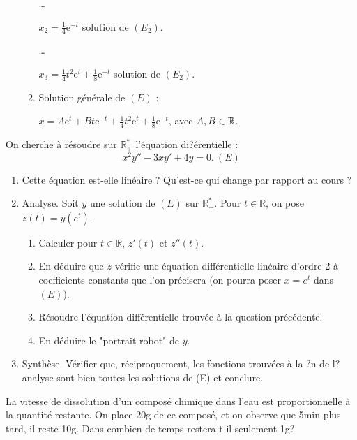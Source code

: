 \documentclass{book}
\begin{document}
\begin{Exercice}
\begin{Correction}
\begin{enumerate}
\begin{enumerate}
		\dots
		
		\hspace{0.7cm} $x_{2} = \tfrac{ 1 }{4}  \mathrm{e}^{ -t} $ solution de $( E_2 )$.		

		\dots
		
		\hspace{0.7cm} $x_{3} = \tfrac{ 1 }{4} t^2 \mathrm{e}^{ t}  + \tfrac{ 1 }{8}  \mathrm{e}^{ -t} $ solution de $( E_2 )$.	
		
		\item Solution générale de $(E)$ :
		
		\hspace{0.7cm} $x =   A  \mathrm{e}^{t} + B t  \mathrm{e}^{-t} +  \tfrac{ 1 }{4} t^2 \mathrm{e}^{ t}  + \tfrac{ 1 }{8}  \mathrm{e}^{ -t}$, avec $A,B \in \mathbb{R}$.	
	\end{enumerate}
\end{enumerate} 
\end{Correction}
\end{Exercice}
\begin{Exercice}
On cherche à résoudre sur $\mathbb R_+^*$ l'équation di?érentielle :
$$x^2y''-3xy'+4y = 0.\ (E)$$
\begin{enumerate}
\item Cette équation est-elle linéaire ? Qu'est-ce qui change par rapport au cours ?
\item Analyse. Soit $y$ une solution de $(E)$ sur $\mathbb R_+^*$. Pour $t\in\mathbb R$, on pose $z(t)=y(e^t)$.
\begin{enumerate}
\item Calculer pour $t\in\mathbb R$, $z'(t)$ et $z''(t)$.
\item En déduire que $z$ vérifie une équation différentielle linéaire d'ordre 2 à coefficients  constants que l'on précisera (on pourra poser $x = e^t$ dans $(E)$). 
\item Résoudre l'équation différentielle trouvée à la question précédente.
\item En déduire le "portrait robot" de $y$.
\end{enumerate}
\item Synthèse. Vérifier que, réciproquement, les fonctions trouvées à la ?n de l?analyse sont bien toutes les solutions de (E) et conclure.
\end{enumerate}
\end{Exercice}
\begin{Exercice}[Dissolution]
La vitesse de dissolution d'un composé chimique dans l'eau est proportionnelle à la quantité restante. On place 20g de ce composé, et on observe que 5min plus tard, il reste 10g. Dans combien de temps restera-t-il seulement 1g?
\end{Exercice}
\end{document}
